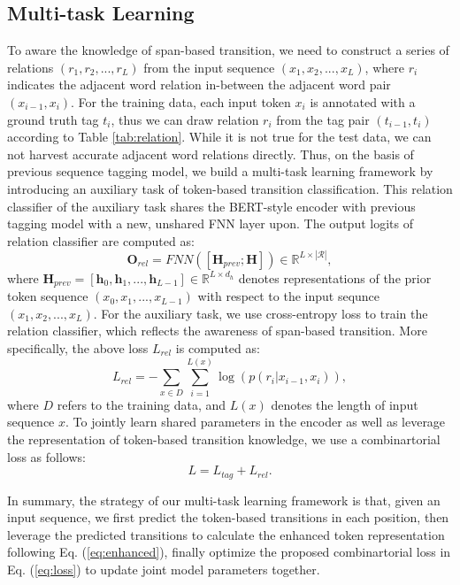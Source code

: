 \documentclass[a4paper]{cas-sc}
\newcommand{\1}[1]{\mathds{1}\left[#1\right]}
\newcommand{\eqnref}[1]{Eq. (\ref{#1})}
\newcommand{\tableref}[1]{Table \ref{#1}}
\begin{document}
\subsection{Multi-task Learning}
\label{sec:multitask}
To aware the knowledge of span-based transition, 
we need to construct a series of relations $(r_1, r_2, ..., r_L)$ from the input sequence $(x_1, x_2, ..., x_L)$, where $r_i$ indicates the adjacent word relation in-between the adjacent word pair $(x_{i-1}, x_i)$.
For the training data, each input token $x_i$ is annotated with a ground truth tag $t_i$, thus we can draw relation $r_i$  from the tag pair $(t_{i-1}, t_i)$ according to \tableref{tab:relation}.
While it is not true for the test data, 
we can not harvest accurate adjacent word relations directly.
Thus, on the basis of previous sequence tagging model, 
we build a multi-task learning framework by introducing an auxiliary task of token-based transition classification.
This relation classifier of the auxiliary task shares the BERT-style encoder with previous tagging model with a new, unshared FNN layer upon. The output logits of relation classifier are computed as: 
\begin{equation}\label{eq:aux_logits}
	\mathbf{O}_{rel}=FNN([ \mathbf{H}_{prev}; \mathbf{H} ]) \in \mathbb{R}^{L \times |\mathcal{R}|},
\end{equation}
where $\mathbf{H}_{prev}=[\mathbf{h}_0, \mathbf{h}_1, ..., \mathbf{h}_{L-1}]\in \mathbb{R}^{L\times d_h}$ denotes representations of the prior token sequence $(x_0, x_1, ..., x_{L-1})$ with respect to the input sequnce $(x_1, x_2, ..., x_L)$.
For the auxiliary task, we use cross-entropy loss to train the relation classifier, which reflects the awareness of span-based transition. 
More specifically, the above loss $L_{rel}$ is computed as:
\begin{equation}\label{eq:rel_loss}
	L_{rel}=- \sum_{x\in D}\sum_{i=1}^{L(x)} \log (p(r_i | x_{i-1}, x_{i})) ,
\end{equation}
where $D$ refers to the training data, and $L(x)$ denotes the length of input sequence $x$. 
To jointly learn shared parameters in the encoder as well as leverage the representation of token-based transition knowledge, we use a combinartorial loss as follows:
\begin{equation}\label{eq:loss}
	L = L_{tag} + L_{rel}.  %
\end{equation}


In summary, 
the strategy of our multi-task learning framework is that, 
given an input sequence, we first predict the token-based transitions in each position, 
then leverage the predicted transitions to calculate the enhanced token representation following \eqnref{eq:enhanced}, 
finally optimize the proposed combinartorial loss in \eqnref{eq:loss} to update joint model parameters together.
\end{document}

